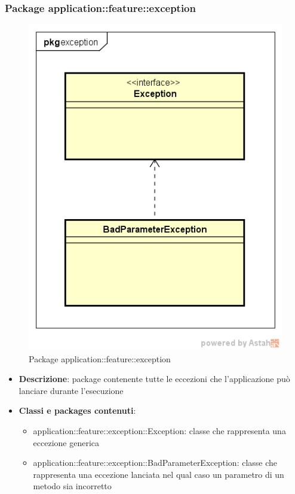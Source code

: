 \subsubsection{Package application::feature::exception}
\label{Package application::feature::exception}
\begin{figure}[H]
	\centering
	\includegraphics[scale=0.5]{Sezioni/Packages/Application/exception.png}
	\caption{Package application::feature::exception}
\end{figure}
\begin{itemize}
	\item \textbf{Descrizione}: package contenente tutte le eccezioni che l'applicazione può lanciare durante l'esecuzione
	\item \textbf{Classi e packages contenuti}:
	\begin{itemize}
	\item application::feature::exception::Exception: classe che rappresenta una eccezione generica
	\item application::feature::exception::BadParameterException: classe che rappresenta una eccezione lanciata nel qual caso un parametro di un metodo sia incorretto
	\end{itemize}
\end{itemize}
